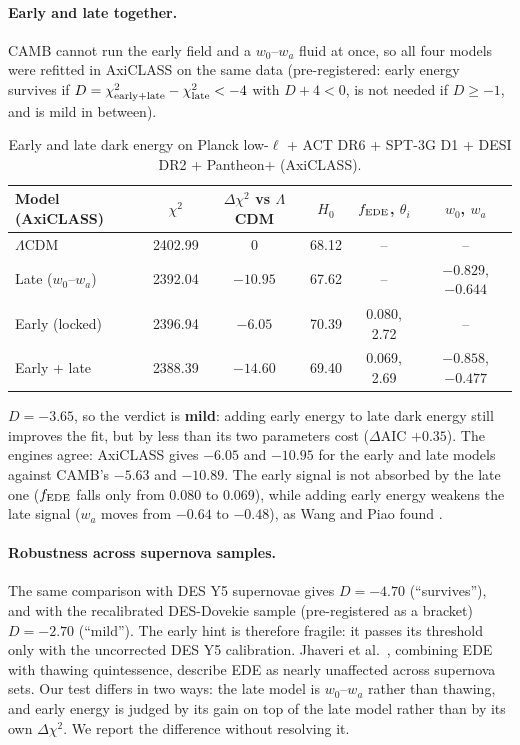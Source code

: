 \documentclass[11pt]{article}
\newcommand{\AthreeD}{\ensuremath{-3.65}}  %
\newcommand{\AthreeVerdict}{\textbf{mild}}  %
\begin{document}
\paragraph{Early and late together.} CAMB cannot run the early field and a $w_0$--$w_a$ fluid at once, so all four
models were refitted in AxiCLASS on the same data (pre-registered: early energy survives if
$D=\chi^2_{\rm early+late}-\chi^2_{\rm late}<-4$ with $D+4<0$, is not needed if $D\ge-1$, and is mild in between).

\begin{table}[h]
\centering
\small
\begin{tabular}{lccccc}
\toprule
Model (AxiCLASS) & $\chi^2$ & $\Delta\chi^2$ vs $\Lambda$CDM & $H_0$ & $f_{\rm EDE}$, $\theta_i$ & $w_0$, $w_a$\\
\midrule
$\Lambda$CDM & 2402.99 & 0 & 68.12 & -- & --\\
Late ($w_0$--$w_a$) & 2392.04 & $-10.95$ & 67.62 & -- & $-0.829$, $-0.644$\\
Early (locked) & 2396.94 & $-6.05$ & 70.39 & 0.080, 2.72 & --\\
Early + late & 2388.39 & $-14.60$ & 69.40 & 0.069, 2.69 & $-0.858$, $-0.477$\\
\bottomrule
\end{tabular}
\caption{Early and late dark energy on Planck low-$\ell$ + ACT DR6 + SPT-3G D1 + DESI DR2 + Pantheon+ (AxiCLASS).}
\label{tab:early_late}
\end{table}

$D=\AthreeD$, so the verdict is \AthreeVerdict: adding early energy to late dark energy still improves the fit, but
by less than its two parameters cost ($\Delta$AIC $+0.35$). The engines agree: AxiCLASS gives $-6.05$ and $-10.95$
for the early and late models against CAMB's $-5.63$ and $-10.89$. The early signal is not absorbed by the late one
($f_{\rm EDE}$ falls only from 0.080 to 0.069), while adding early energy weakens the late signal ($w_a$ moves from
$-0.64$ to $-0.48$), as Wang and Piao found \cite{wangpiao2025}.

\paragraph{Robustness across supernova samples.} The same comparison with DES Y5 supernovae gives $D=-4.70$
(``survives''), and with the recalibrated DES-Dovekie sample (pre-registered as a bracket) $D=-2.70$ (``mild''). The
early hint is therefore fragile: it passes its threshold only with the uncorrected DES Y5 calibration. Jhaveri et
al.\ \cite{jhaveri2026}, combining EDE with thawing quintessence, describe EDE as nearly unaffected across supernova
sets. Our test differs in two ways: the late model is $w_0$--$w_a$ rather than thawing, and early energy is judged
by its gain on top of the late model rather than by its own $\Delta\chi^2$. We report the difference without
resolving it.
\end{document}
